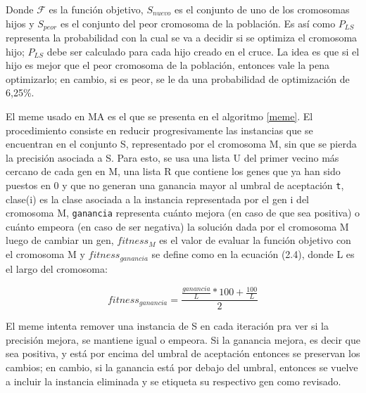 Donde $\mathcal{F}$ es la función objetivo, $S_{nuevo}$ es el conjunto de uno de los cromosomas hijos y $S_{peor}$ es el conjunto del peor cromosoma de la población. Es así como $P_{LS}$ representa la probabilidad con la cual se va a decidir si se optimiza el cromosoma hijo; $P_{LS}$ debe ser calculado para cada hijo creado en el cruce. La idea es que si el hijo es mejor que el peor cromosoma de la población, entonces vale la pena optimizarlo; en cambio, si es peor, se le da una probabilidad de optimización de 6,25\%.

El meme usado en MA es el que se presenta en el algoritmo \ref{meme}. El procedimiento consiste en reducir progresivamente las instancias que se encuentran en el conjunto S, representado por el cromosoma M, sin que se pierda la precisión asociada a S. Para esto, se usa una lista U del primer vecino más cercano de cada gen en M, una lista R que contiene los genes que ya han sido puestos en 0 y que no generan una ganancia mayor al umbral de aceptación \texttt{t}, clase(i) es la clase asociada a la instancia representada por el gen i del cromosoma M, \texttt{ganancia} representa cuánto mejora (en caso de que sea positiva) o cuánto empeora (en caso de ser negativa) la solución dada por el cromosoma M luego de cambiar un gen, $fitness_M$ es el valor de evaluar la función objetivo con el cromosoma M y $fitness_{ganancia}$ se define como en la ecuación (2.4), donde L es el largo del cromosoma:

\begin{equation}
fitness_{ganancia} = \frac{\frac{ganancia}{L}*100 + \frac{100}{L}}{2}
\end{equation}  

El meme intenta remover una instancia de S en cada iteración pra ver si la precisión mejora, se mantiene igual o empeora. Si la ganancia mejora, es decir que sea positiva, y está por encima del umbral de aceptación entonces se preservan los cambios; en cambio, si la ganancia está por debajo del umbral, entonces se vuelve a incluir la instancia eliminada y se etiqueta su respectivo gen como revisado.
 
